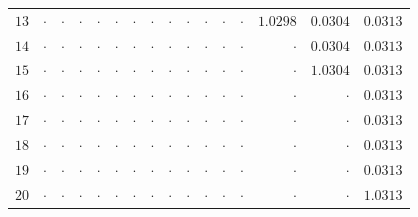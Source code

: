 \begin{table}[H]
{\begin{tabular}{r|rrrrrrrrrrrrrrr}
$13$ & $\cdot$ & $\cdot$ & $\cdot$ & $\cdot$ & $\cdot$ & $\cdot$ & $\cdot$ & $\cdot$ & $\cdot$ & $\cdot$ & $\cdot$ & $\cdot$ & \cellcolor{orange!35}$\mathbf{1.0298}$ & \cellcolor{cyan!18}$0.0304$ & \cellcolor{cyan!18}$0.0313$ \\
$14$ & $\cdot$ & $\cdot$ & $\cdot$ & $\cdot$ & $\cdot$ & $\cdot$ & $\cdot$ & $\cdot$ & $\cdot$ & $\cdot$ & $\cdot$ & $\cdot$ & $\cdot$ & \cellcolor{cyan!18}$0.0304$ & \cellcolor{cyan!18}$0.0313$ \\
$15$ & $\cdot$ & $\cdot$ & $\cdot$ & $\cdot$ & $\cdot$ & $\cdot$ & $\cdot$ & $\cdot$ & $\cdot$ & $\cdot$ & $\cdot$ & $\cdot$ & $\cdot$ & \cellcolor{orange!35}$\mathbf{1.0304}$ & \cellcolor{cyan!18}$0.0313$ \\
$16$ & $\cdot$ & $\cdot$ & $\cdot$ & $\cdot$ & $\cdot$ & $\cdot$ & $\cdot$ & $\cdot$ & $\cdot$ & $\cdot$ & $\cdot$ & $\cdot$ & $\cdot$ & $\cdot$ & \cellcolor{cyan!18}$0.0313$ \\
$17$ & $\cdot$ & $\cdot$ & $\cdot$ & $\cdot$ & $\cdot$ & $\cdot$ & $\cdot$ & $\cdot$ & $\cdot$ & $\cdot$ & $\cdot$ & $\cdot$ & $\cdot$ & $\cdot$ & \cellcolor{cyan!18}$0.0313$ \\
$18$ & $\cdot$ & $\cdot$ & $\cdot$ & $\cdot$ & $\cdot$ & $\cdot$ & $\cdot$ & $\cdot$ & $\cdot$ & $\cdot$ & $\cdot$ & $\cdot$ & $\cdot$ & $\cdot$ & \cellcolor{cyan!18}$0.0313$ \\
$19$ & $\cdot$ & $\cdot$ & $\cdot$ & $\cdot$ & $\cdot$ & $\cdot$ & $\cdot$ & $\cdot$ & $\cdot$ & $\cdot$ & $\cdot$ & $\cdot$ & $\cdot$ & $\cdot$ & \cellcolor{cyan!18}$0.0313$ \\
$20$ & $\cdot$ & $\cdot$ & $\cdot$ & $\cdot$ & $\cdot$ & $\cdot$ & $\cdot$ & $\cdot$ & $\cdot$ & $\cdot$ & $\cdot$ & $\cdot$ & $\cdot$ & $\cdot$ & \cellcolor{orange!35}$\mathbf{1.0313}$ \\
\bottomrule
\end{tabular}}
\end{table}
